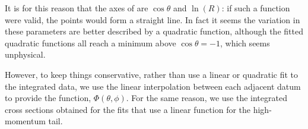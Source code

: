 It is for this reason that the axes of  are $\cos\theta$ and $\ln(R)$: if such a function were valid, the points would form a straight line.
In fact it seems the variation in these parameters are better described by a quadratic function, although the fitted quadratic functions all reach a minimum above $\cos\theta=-1$, which seems unphysical.

However, to keep things conservative, rather than use  a linear or quadratic fit to the integrated data, we use the linear interpolation between each adjacent datum to provide the function, $\Phi(\theta,\phi)$.
For the same reason, we use the integrated cross sections obtained for the fits that use a linear function for the high-momentum tail.

%
